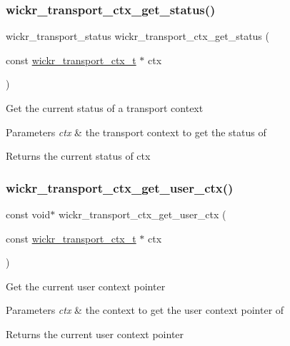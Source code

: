 \subsubsection{\texorpdfstring{wickr\_transport\_ctx\_get\_status()}{wickr\_transport\_ctx\_get\_status()}}
{\footnotesize\ttfamily wickr\+\_\+transport\+\_\+status wickr\+\_\+transport\+\_\+ctx\+\_\+get\+\_\+status (\begin{DoxyParamCaption}\item[{const \mbox{\hyperlink{structwickr__transport__ctx}{wickr\+\_\+transport\+\_\+ctx\+\_\+t}} $\ast$}]{ctx }\end{DoxyParamCaption})}

Get the current status of a transport context


\begin{DoxyParams}{Parameters}
{\em ctx} & the transport context to get the status of \\
\hline
\end{DoxyParams}
\begin{DoxyReturn}{Returns}
the current status of \textquotesingle{}ctx\textquotesingle{} 
\end{DoxyReturn}
\mbox{\label{group__wickr__transport__ctx_gaea14ff3de739f7bf4f85516fdefd1ea9}} 
\subsubsection{\texorpdfstring{wickr\_transport\_ctx\_get\_user\_ctx()}{wickr\_transport\_ctx\_get\_user\_ctx()}}
{\footnotesize\ttfamily const void$\ast$ wickr\+\_\+transport\+\_\+ctx\+\_\+get\+\_\+user\+\_\+ctx (\begin{DoxyParamCaption}\item[{const \mbox{\hyperlink{structwickr__transport__ctx}{wickr\+\_\+transport\+\_\+ctx\+\_\+t}} $\ast$}]{ctx }\end{DoxyParamCaption})}

Get the current user context pointer


\begin{DoxyParams}{Parameters}
{\em ctx} & the context to get the user context pointer of \\
\hline
\end{DoxyParams}
\begin{DoxyReturn}{Returns}
the current user context pointer 
\end{DoxyReturn}
\mbox{\label{group__wickr__transport__ctx_gabd4c671c3f420e804dae16c662bc71c7}} 
